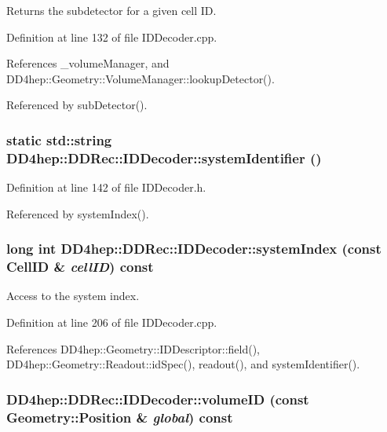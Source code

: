 Returns the subdetector for a given cell ID. 

Definition at line 132 of file IDDecoder.cpp.

References \_\-volumeManager, and DD4hep::Geometry::VolumeManager::lookupDetector().

Referenced by subDetector().\hypertarget{class_d_d4hep_1_1_d_d_rec_1_1_i_d_decoder_a11948929195ead4902e59730ad4a582f}{
\subsubsection[{systemIdentifier}]{\setlength{\rightskip}{0pt plus 5cm}static std::string DD4hep::DDRec::IDDecoder::systemIdentifier ()}}
\label{class_d_d4hep_1_1_d_d_rec_1_1_i_d_decoder_a11948929195ead4902e59730ad4a582f}


Definition at line 142 of file IDDecoder.h.

Referenced by systemIndex().\hypertarget{class_d_d4hep_1_1_d_d_rec_1_1_i_d_decoder_a6841753c1a36c89967c93b6fc9ffc8ee}{
\subsubsection[{systemIndex}]{\setlength{\rightskip}{0pt plus 5cm}long int DD4hep::DDRec::IDDecoder::systemIndex (const {\bf CellID} \& {\em cellID}) const}}
\label{class_d_d4hep_1_1_d_d_rec_1_1_i_d_decoder_a6841753c1a36c89967c93b6fc9ffc8ee}


Access to the system index. 

Definition at line 206 of file IDDecoder.cpp.

References DD4hep::Geometry::IDDescriptor::field(), DD4hep::Geometry::Readout::idSpec(), readout(), and systemIdentifier().\hypertarget{class_d_d4hep_1_1_d_d_rec_1_1_i_d_decoder_a44f55112f9d660bf5db4c5de716ecf19}{
\subsubsection[{volumeID}]{ DD4hep::DDRec::IDDecoder::volumeID (const {\bf Geometry::Position} \& {\em global}) const}}
\label{class_d_d4hep_1_1_d_d_rec_1_1_i_d_decoder_a44f55112f9d660bf5db4c5de716ecf19}


